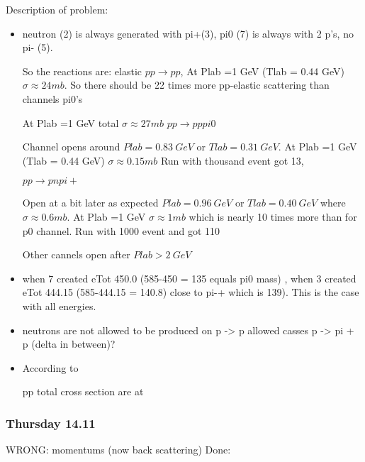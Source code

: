Description of problem:

\begin{itemize}
  
\item neutron (2) is always generated with pi+(3), pi0 (7) is always with 2
  p's, no pi- (5). 

So the reactions are: elastic $p p \rightarrow pp$, 
At Plab =1 GeV (Tlab = 0.44 GeV)  $\sigma \approx 24mb $.
So there should be 22 times more pp-elastic scattering
 than channels pi0's

At Plab =1 GeV total $\sigma \approx 27mb $
$p p \rightarrow p p pi0$ 

Channel opens around  $Plab = 0.83~GeV$ or $Tlab = 0.31~GeV$. 
At Plab =1 GeV (Tlab = 0.44 GeV)  $\sigma \approx 0.15mb $
Run with thousand event got 13,

$p p \rightarrow p n pi+$ 

Open at a bit later as expected $Plab = 0.96~GeV$ or $Tlab = 0.40~GeV$ where $\sigma \approx 0.6 mb$. 
At Plab =1 GeV  $\sigma \approx 1mb $ which is nearly 10 times more than for p0 channel.
Run with 1000 event and got 110

  Other cannels open after $Plab > 2~GeV$
  
\item when 7 created eTot 450.0 (585-450 = 135 equals pi0 mass) , when
  3 created eTot 444.15 (585-444.15 = 140.8) close to pi-+ which is
  139). This is the case with all energies.
\item neutrons are not allowed to be produced on p -> p allowed casses
  p -> pi + p (delta in between)?
\item According to
  
   pp
  total cross section are at

\end{itemize}

\subsubsection{Thursday 14.11}


WRONG: momentums (now back scattering) Done:

